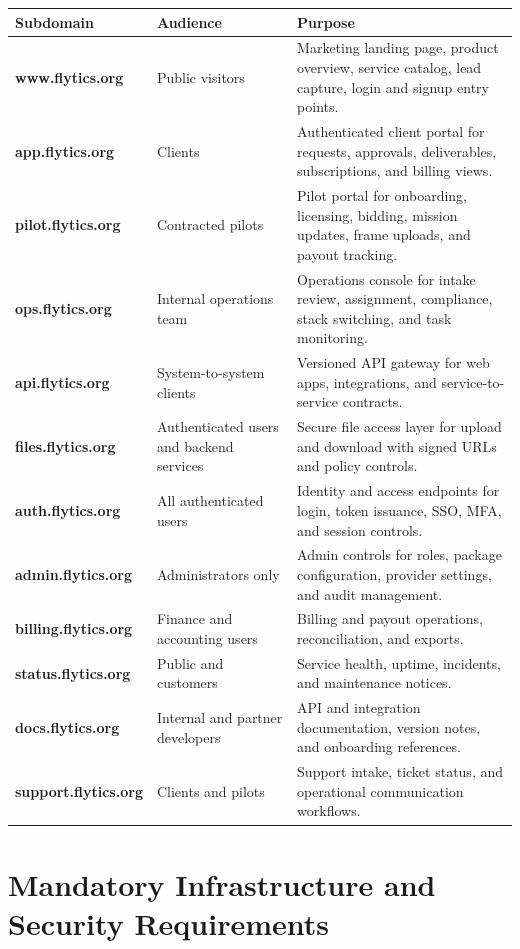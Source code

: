 \documentclass[11pt,a4paper]{article}
\begin{document}
\begin{longtable}{>{\bfseries}p{}p{}p{}}
\toprule
Subdomain & Audience & Purpose \\
\midrule
www.flytics.org & Public visitors & Marketing landing page, product overview, service catalog, lead capture, login and signup entry points. \\
app.flytics.org & Clients & Authenticated client portal for requests, approvals, deliverables, subscriptions, and billing views. \\
pilot.flytics.org & Contracted pilots & Pilot portal for onboarding, licensing, bidding, mission updates, frame uploads, and payout tracking. \\
ops.flytics.org & Internal operations team & Operations console for intake review, assignment, compliance, stack switching, and task monitoring. \\
api.flytics.org & System-to-system clients & Versioned API gateway for web apps, integrations, and service-to-service contracts. \\
files.flytics.org & Authenticated users and backend services & Secure file access layer for upload and download with signed URLs and policy controls. \\
auth.flytics.org & All authenticated users & Identity and access endpoints for login, token issuance, SSO, MFA, and session controls. \\
admin.flytics.org & Administrators only & Admin controls for roles, package configuration, provider settings, and audit management. \\
billing.flytics.org & Finance and accounting users & Billing and payout operations, reconciliation, and exports. \\
status.flytics.org & Public and customers & Service health, uptime, incidents, and maintenance notices. \\
docs.flytics.org & Internal and partner developers & API and integration documentation, version notes, and onboarding references. \\
support.flytics.org & Clients and pilots & Support intake, ticket status, and operational communication workflows. \\
\bottomrule
\end{longtable}

\section{Mandatory Infrastructure and Security Requirements}
\end{document}
